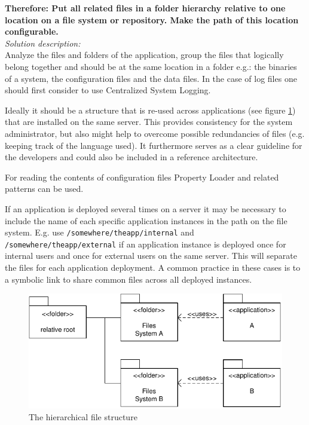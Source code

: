\begin{center}
   
\end{center}

\textbf{Therefore: Put all related files in a folder hierarchy relative to one location on a file system or repository. Make the path of this location configurable.}\\

\textit{Solution description:}\\
Analyze the files and folders of the application, group the files  that logically belong together and should be at the same location in a folder e.g.: the binaries of a system, the configuration files and the data files. In the case of log files one should first consider to use {\sc Centralized System Logging}.

Ideally it should be a structure that is re-used across applications (see figure \ref{fig:singleFileLocationDiagram-01}) that are installed on the same server. This provides consistency for the system administrator, but also might help to overcome possible redundancies of files (e.g. keeping track of the language used). It furthermore serves as a clear guideline for the developers and could also be included in a reference architecture.

For reading the contents of configuration files {\sc Property Loader} and related patterns \cite{Wellhausen2010} can be used. 

If an application is deployed several times on a server it may be necessary to include the name of each specific application instances in the path on the file system. E.g. use \verb|/somewhere/theapp/internal| and \verb|/somewhere/theapp/external| if an application instance is deployed once for internal users and once for external users on the same server. This will separate the files for each application deployment. A common practice in these cases is to a symbolic link to share common files across all deployed instances. 
\begin{figure}[h]
\centering
\includegraphics{patterns/singleFileLocationDiagram-01.pdf}
\caption{The hierarchical file structure}
\label{fig:singleFileLocationDiagram-01}
\end{figure}

